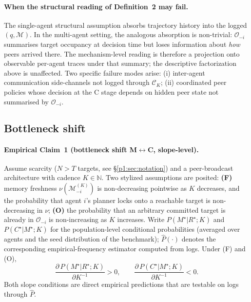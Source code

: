 \documentclass{article}
\begin{document}
\paragraph{When the structural reading of Definition~2 may fail.}
The single-agent structural assumption absorbs trajectory history into
the logged $(q, \mathcal{M})$. In the multi-agent setting, the
analogous absorption is non-trivial: $\mathcal{O}_{-i}$ summarises
target occupancy at decision time but loses information about
\emph{how} peers arrived there. The mechanism-level reading is
therefore a projection onto observable per-agent traces under that
summary; the descriptive factorization above is unaffected. Two
specific failure modes arise: (i) inter-agent communication
side-channels not logged through $\mathcal{C}_K$; (ii) coordinated
peer policies whose decision at the C stage depends on hidden peer
state not summarised by $\mathcal{O}_{-i}$.

\subsection{Bottleneck shift}
\label{p1:sec:shift}

\paragraph{Empirical Claim~1 (bottleneck shift M$\leftrightarrow$C, slope-level).}
Assume scarcity ($N > T$ targets, see \S\ref{p1:sec:notation}) and a
peer-broadcast architecture with cadence $K \in \mathbb{N}$. Two
stylized assumptions are posited:
\textbf{(F)} memory freshness $\nu(\mathcal{M}_{-i}^{(K)})$ is
non-decreasing pointwise as $K$ decreases, and the probability that
agent $i$'s planner locks onto a reachable target is non-decreasing in
$\nu$;
\textbf{(O)} the probability that an arbitrary committed target is
already in $\mathcal{O}_{-i}$ is non-increasing as $K$ increases.
Write $P(M^\star|R^\star;K)$ and $P(C^\star|M^\star;K)$ for the
population-level conditional probabilities (averaged over agents and
the seed distribution of the benchmark); $\hat{P}(\cdot)$ denotes the
corresponding empirical-frequency estimator computed from logs. Under
(F) and (O),
\[
\frac{\partial\, P(M^\star|R^\star;K)}{\partial K^{-1}} > 0,
\qquad
\frac{\partial\, P(C^\star|M^\star;K)}{\partial K^{-1}} < 0.
\]
Both slope conditions are direct empirical predictions that are
testable on logs through $\hat{P}$.
\end{document}
